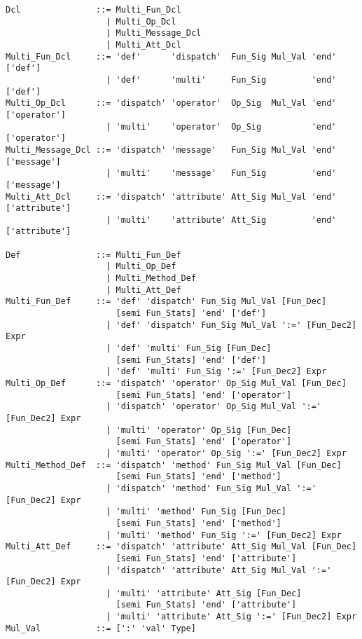 \grammar\begin{lstlisting}
Dcl               ::= Multi_Fun_Dcl
                    | Multi_Op_Dcl
                    | Multi_Message_Dcl
                    | Multi_Att_Dcl
Multi_Fun_Dcl     ::= 'def'      'dispatch'  Fun_Sig Mul_Val 'end' ['def']
                    | 'def'      'multi'     Fun_Sig         'end' ['def']
Multi_Op_Dcl      ::= 'dispatch' 'operator'  Op_Sig  Mul_Val 'end' ['operator']
                    | 'multi'    'operator'  Op_Sig          'end' ['operator']
Multi_Message_Dcl ::= 'dispatch' 'message'   Fun_Sig Mul_Val 'end' ['message']
                    | 'multi'    'message'   Fun_Sig         'end' ['message']
Multi_Att_Dcl     ::= 'dispatch' 'attribute' Att_Sig Mul_Val 'end' ['attribute']
                    | 'multi'    'attribute' Att_Sig         'end' ['attribute']

Def               ::= Multi_Fun_Def
                    | Multi_Op_Def
                    | Multi_Method_Def
                    | Multi_Att_Def
Multi_Fun_Def     ::= 'def' 'dispatch' Fun_Sig Mul_Val [Fun_Dec] 
                      [semi Fun_Stats] 'end' ['def']
                    | 'def' 'dispatch' Fun_Sig Mul_Val ':=' [Fun_Dec2] Expr
                    | 'def' 'multi' Fun_Sig [Fun_Dec] 
                      [semi Fun_Stats] 'end' ['def']
                    | 'def' 'multi' Fun_Sig ':=' [Fun_Dec2] Expr
Multi_Op_Def      ::= 'dispatch' 'operator' Op_Sig Mul_Val [Fun_Dec] 
                      [semi Fun_Stats] 'end' ['operator']
                    | 'dispatch' 'operator' Op_Sig Mul_Val ':=' [Fun_Dec2] Expr
                    | 'multi' 'operator' Op_Sig [Fun_Dec] 
                      [semi Fun_Stats] 'end' ['operator']
                    | 'multi' 'operator' Op_Sig ':=' [Fun_Dec2] Expr
Multi_Method_Def  ::= 'dispatch' 'method' Fun_Sig Mul_Val [Fun_Dec] 
                      [semi Fun_Stats] 'end' ['method']
                    | 'dispatch' 'method' Fun_Sig Mul_Val ':=' [Fun_Dec2] Expr
                    | 'multi' 'method' Fun_Sig [Fun_Dec] 
                      [semi Fun_Stats] 'end' ['method']
                    | 'multi' 'method' Fun_Sig ':=' [Fun_Dec2] Expr
Multi_Att_Def     ::= 'dispatch' 'attribute' Att_Sig Mul_Val [Fun_Dec] 
                      [semi Fun_Stats] 'end' ['attribute']
                    | 'dispatch' 'attribute' Att_Sig Mul_Val ':=' [Fun_Dec2] Expr
                    | 'multi' 'attribute' Att_Sig [Fun_Dec] 
                      [semi Fun_Stats] 'end' ['attribute']
                    | 'multi' 'attribute' Att_Sig ':=' [Fun_Dec2] Expr 
Mul_Val           ::= [':' 'val' Type]
\end{lstlisting}

